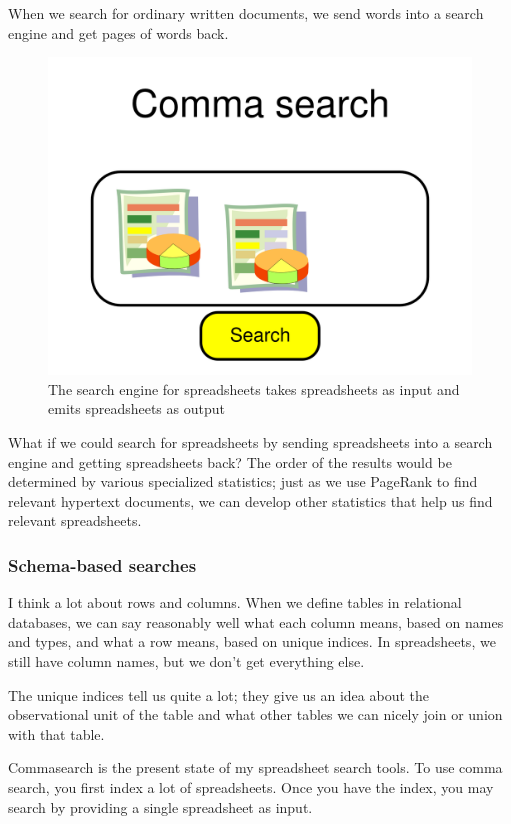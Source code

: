 \documentclass{acm_proc_article-sp}
\begin{document}
When we search for ordinary written documents, we send words into a search
engine and get pages of words back.

\begin{figure}
\includegraphics[width=\columnwidth]{../pagerank-for-spreadsheets/commasearch.png}
\caption{The search engine for spreadsheets takes spreadsheets as input and emits spreadsheets as output}
\centering
\end{figure}

What if we could search for spreadsheets
by sending spreadsheets into a search engine and getting spreadsheets back?
The order of the results would be determined by various specialized statistics;
just as we use PageRank to find relevant hypertext documents, we can develop
other statistics that help us find relevant spreadsheets.

\subsubsection{Schema-based searches}
I think a lot about rows and columns. When we define tables in relational
databases, we can say reasonably well what each column means, based on
names and types, and what a row means, based on unique indices.
In spreadsheets, we still have column names, but we don't get everything
else.

The unique indices tell us quite a lot; they give us an idea about the
observational unit of the table and what other tables we can nicely
join or union with that table.

Commasearch \cite{commasearch} is the present state of my spreadsheet search
tools. To use comma search, you first index a lot of spreadsheets. Once you
have the index, you may search by providing a single spreadsheet as input.
\end{document}
